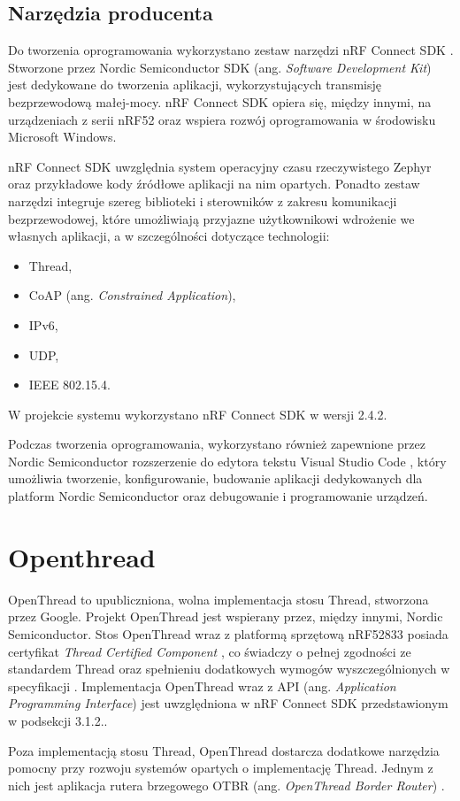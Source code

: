 \subsection{Narzędzia producenta}

    Do tworzenia oprogramowania wykorzystano zestaw narzędzi nRF Connect SDK \cite{nrf-connect}. Stworzone przez Nordic Semiconductor SDK (ang. \textit{Software Development Kit}) jest dedykowane do tworzenia aplikacji, wykorzystujących transmisję bezprzewodową małej-mocy. nRF Connect SDK opiera się, między innymi, na urządzeniach z serii nRF52 oraz wspiera rozwój oprogramowania w środowisku Microsoft Windows.

    nRF Connect SDK uwzględnia system operacyjny czasu rzeczywistego Zephyr oraz przykładowe kody źródłowe aplikacji na nim opartych. Ponadto zestaw narzędzi integruje szereg biblioteki i sterowników z zakresu komunikacji bezprzewodowej, które umożliwiają przyjazne użytkownikowi wdrożenie we własnych aplikacji, a w szczególności dotyczące technologii:
    \begin{itemize}
        \item Thread,
        \item CoAP (ang. \textit{Constrained Application}),
        \item IPv6,
        \item UDP,
        \item IEEE 802.15.4.
    \end{itemize}

    W projekcie systemu wykorzystano nRF Connect SDK w wersji 2.4.2.

    Podczas tworzenia oprogramowania, wykorzystano również zapewnione przez Nordic Semiconductor rozszerzenie do edytora tekstu Visual Studio Code \cite{nrf-ide}, który umożliwia tworzenie, konfigurowanie, budowanie aplikacji dedykowanych dla platform Nordic Semiconductor oraz debugowanie i programowanie urządzeń. 

\section{Openthread}

    OpenThread to upubliczniona, wolna implementacja stosu Thread, stworzona przez Google. Projekt OpenThread jest wspierany przez, między innymi, Nordic Semiconductor. Stos OpenThread wraz z platformą sprzętową nRF52833 posiada certyfikat \textit{Thread Certified Component} \cite{nrf52833-tcc}, co świadczy o pełnej zgodności ze standardem Thread oraz spełnieniu dodatkowych wymogów wyszczególnionych w specyfikacji \cite{thread-1.3.0}. Implementacja OpenThread wraz z API (ang. \textit{Application Programming Interface}) jest uwzględniona w nRF Connect SDK przedstawionym w podsekcji 3.1.2..

    Poza implementacją stosu Thread, OpenThread dostarcza dodatkowe narzędzia pomocny przy rozwoju systemów opartych o implementację Thread. Jednym z nich jest aplikacja rutera brzegowego OTBR (ang. \textit{OpenThread Border Router}) \cite{openthread-br}.